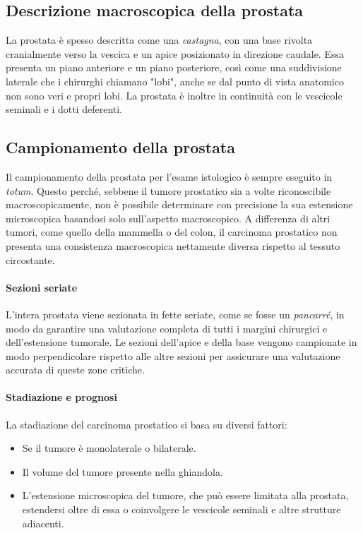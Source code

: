 \subsection{Descrizione macroscopica della prostata}
La prostata è spesso descritta come una \textit{castagna}, con una base rivolta cranialmente verso la vescica e un apice posizionato in direzione caudale. Essa presenta un piano anteriore e un piano posteriore, così come una suddivisione laterale che i chirurghi chiamano "lobi", anche se dal punto di vista anatomico non sono veri e propri lobi. La prostata è inoltre in continuità con le vescicole seminali e i dotti deferenti.

\subsection{Campionamento della prostata}
Il campionamento della prostata per l'esame istologico è sempre eseguito in \textit{totum}. Questo perché, sebbene il tumore prostatico sia a volte riconoscibile macroscopicamente, non è possibile determinare con precisione la sua estensione microscopica basandosi solo sull'aspetto macroscopico. A differenza di altri tumori, come quello della mammella o del colon, il carcinoma prostatico non presenta una consistenza macroscopica nettamente diversa rispetto al tessuto circostante.

\paragraph{Sezioni seriate}
L'intera prostata viene sezionata in fette seriate, come se fosse un \textit{pancarré}, in modo da garantire una valutazione completa di tutti i margini chirurgici e dell'estensione tumorale. Le sezioni dell'apice e della base vengono campionate in modo perpendicolare rispetto alle altre sezioni per assicurare una valutazione accurata di queste zone critiche. 

\paragraph{Stadiazione e prognosi}
La stadiazione del carcinoma prostatico si basa su diversi fattori: 
\begin{itemize}
    \item Se il tumore è monolaterale o bilaterale.
    \item Il volume del tumore presente nella ghiandola.
    \item L'estensione microscopica del tumore, che può essere limitata alla prostata, estendersi oltre di essa o coinvolgere le vescicole seminali e altre strutture adiacenti.
\end{itemize}

